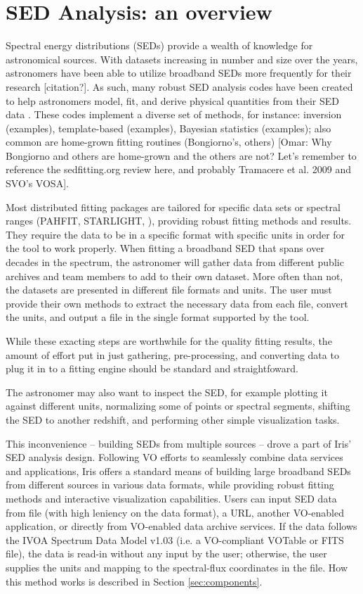 \section{SED Analysis: an overview}
\label{sec:overview}

Spectral energy distributions (SEDs) provide a wealth of knowledge for astronomical sources. With datasets increasing in number and size over the years, astronomers have been able to utilize broadband SEDs more frequently for their research [citation?]. As such, many robust SED analysis codes have been created to help astronomers model, fit, and derive physical quantities from their SED data \cite{2011Ap&SS.331....1W}\cite{2013ARA&A..51..393C}. These codes implement a diverse set of methods, for instance: inversion (examples), template-based (examples), Bayesian statistics (examples); also common are home-grown fitting routines (Bongiorno's, others) [Omar: Why Bongiorno and others are home-grown and the others are not? Let's remember to reference the sedfitting.org review here, and probably Tramacere et al. 2009 and SVO's VOSA]. 

Most distributed fitting packages are tailored for specific data sets or spectral ranges (PAHFIT, STARLIGHT, ), providing robust fitting methods and results. They require the data to be in a specific format with specific units in order for the tool to work properly. When fitting a broadband SED that spans over decades in the spectrum, the astronomer will gather data from different public archives and team members to add to their own dataset. More often than not, the datasets are presented in different file formats and units. The user must provide their own methods to extract the necessary data from each file, convert the units, and output a file in the single format supported by the tool.

While these exacting steps are worthwhile for the quality fitting results, the amount of effort put in just gathering, pre-processing, and converting data to plug it in to a fitting engine should be standard and straightfoward.

The astronomer may also want to inspect the SED, for example plotting it against different units, normalizing some of points or spectral segments, shifting the SED to another redshift, and performing other simple visualization tasks.

This inconvenience -- building SEDs from multiple sources -- drove a part of Iris' SED analysis design. Following VO efforts to seamlessly combine data services and applications, Iris offers a standard means of building large broadband SEDs from different sources in various data formats, while providing robust fitting methods and interactive visualization capabilities. Users can input SED data from file (with high leniency on the data format), a URL, another VO-enabled application, or directly from VO-enabled data archive services. If the data follows the IVOA Spectrum Data Model v1.03 (i.e. a VO-compliant VOTable or FITS file), the data is read-in without any input by the user; otherwise, the user supplies the units and  mapping to the spectral-flux coordinates in the file. How this method works is described in Section \ref{sec:components}. 

